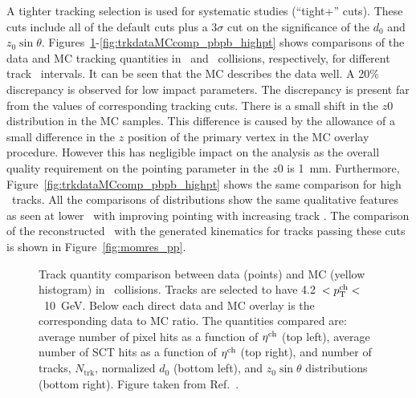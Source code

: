 A tighter tracking selection is used for systematic studies (``tight+'' cuts).
These cuts include all of the default cuts plus a 3$\sigma$ cut on the significance of the $d_0$ and $z_0 \sin\theta$.
Figures~\ref{fig:trkdataMCcomp_pp}-\ref{fig:trkdataMCcomp_pbpb_highpt} shows comparisons of the data and MC tracking quantities in \pp\ and \pbpb\ collisions, respectively, for different track \pT\ intervals.
It can be seen that the MC describes the data well.
A 20\% discrepancy is observed for low impact parameters.
The discrepancy is present far from the values of corresponding tracking cuts.
There is a small shift in the $z0$ distribution in the MC samples.
This difference is caused by the allowance of a small difference in the $z$ position of the primary vertex in the MC overlay procedure.
However this has negligible impact on the analysis as the overall quality requirement on the pointing parameter in the $z0$ is 1~mm.
Furthermore, Figure~\ref{fig:trkdataMCcomp_pbpb_highpt} shows the same comparison for high \pt\ tracks.
All the comparisons of distributions show the same qualitative features as seen at lower \pt\ with improving pointing with increasing track \pt.
The comparison of the reconstructed \pttrk\ with the generated kinematics for tracks passing these cuts is shown in Figure~\ref{fig:momres_pp}.

\begin{figure}
\caption{Track quantity comparison between data (points) and MC (yellow histogram) in \pp\ collisions.
Tracks are selected to have 4.2~$<\mbox{$p_{\mathrm{T}}^{\mathrm{ch}}$}<$~10~GeV.
Below each direct data and MC overlay is the corresponding data to MC ratio.
The quantities compared are: average number of pixel hits as a function of $\mbox{$\eta^{\mathrm{ch}}$}$ (top left), average number of SCT hits as a function of $\mbox{$\eta^{\mathrm{ch}}$}$ (top right), and number of tracks, $N_{\mathrm{trk}}$, normalized $d_0$ (bottom left), and $z_0 \sin\theta$ distributions (bottom right).
Figure taken from Ref.~\cite{Sickles:2235420}.}
\label{fig:trkdataMCcomp_pp}
\end{figure}

